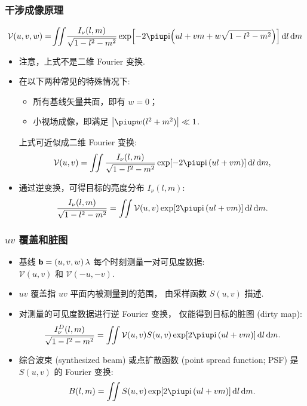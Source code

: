 \documentclass{beamer}
\begin{document}
\begin{frame}[subsec]
  \frametitle{干涉成像原理}
  \vspace{-1ex}
  \begin{equation}
    \mathcal{V}(u,v,w)
      = \!\iint \!\frac{I_{\nu}(l,m)}{\sqrt{1-l^2-m^2}}
      \exp \!\left[ -2\Cpi\Ci \!\left( ul+vm+w\sqrt{1-l^2-m^2} \right) \right]
      \D{l}\,\D{m}
  \end{equation}

  \begin{itemize}
    \item 注意，上式\alert{不是}二维 Fourier 变换.
    \item 在以下两种常见的特殊情况下:
      \begin{itemize}
        \item 所有基线矢量共面，即有 $w = 0$；
        \item 小视场成像，即满足 $\big| \Cpi w(l^2+m^2) \big| \ll 1$.
      \end{itemize}
      上式可近似成二维 Fourier 变换:
      \begin{equation}
        \mathcal{V}(u,v)
          = \iint \frac{I_{\nu}(l,m)}{\sqrt{1-l^2-m^2}}
            \exp [-2\Cpi\Ci\, (ul+vm)] \,\D{l}\,\D{m},
      \end{equation}
    \item 通过逆变换，可得目标的亮度分布 $I_{\nu}(l,m)$:
      \begin{equation}
        \frac{I_{\nu}(l,m)}{\sqrt{1-l^2-m^2}}
          = \iint \mathcal{V}(u,v)
            \exp [2\Cpi\Ci\, (ul+vm)] \,\D{l}\,\D{m}.
      \end{equation}
  \end{itemize}
\end{frame}

\begin{frame}[subsec]
  \frametitle{$uv$ 覆盖和脏图}
  \begin{itemize}
    \item 基线 $\bm{\mathsf{b}} = (u,v,w) \,\lambda$ 每个时刻测量一对可见度数据: \\
      $\mathcal{V}(u,v)$ 和 $\mathcal{V}(-u,-v)$.
    \item \alert{$uv$ 覆盖}指 $uv$ 平面内被测量到的范围，
      由\alert{采样函数} $S(u,v)$ 描述.
    \item 对测量的可见度数据进行逆 Fourier 变换，
      仅能得到目标的\alert{脏图 (dirty map)}:
      \begin{equation}
        \frac{I_{\nu}^D(l,m)}{\sqrt{1-l^2-m^2}}
          = \iint \mathcal{V}(u,v) S(u,v)
            \exp [2\Cpi\Ci\, (ul+vm)] \,\D{l}\,\D{m}.
      \end{equation}
    \item \alert{综合波束 (synthesized beam)}
      或\alert{点扩散函数 (point spread function; PSF)}
      是 $S(u,v)$ 的 Fourier 变换:
      \begin{equation}
        B(l,m) = \iint S(u,v) \exp [2\Cpi\Ci\, (ul+vm)] \,\D{l}\,\D{m}.
      \end{equation}
  \end{itemize}
\end{frame}
\end{document}
